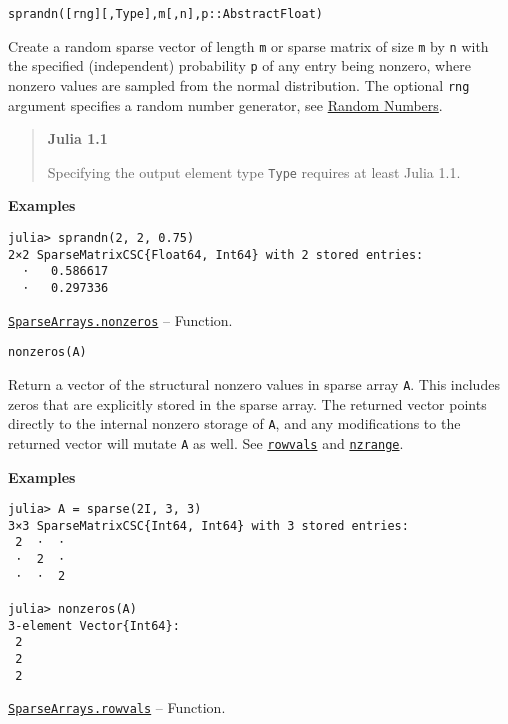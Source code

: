 \begin{adjustwidth}{2em}{0pt}


\begin{verbatim}
sprandn([rng][,Type],m[,n],p::AbstractFloat)
\end{verbatim}

Create a random sparse vector of length \texttt{m} or sparse matrix of size \texttt{m} by \texttt{n} with the specified (independent) probability \texttt{p} of any entry being nonzero, where nonzero values are sampled from the normal distribution. The optional \texttt{rng} argument specifies a random number generator, see \href{@ref}{Random Numbers}.

\begin{quote}
\textbf{Julia 1.1}

Specifying the output element type \texttt{Type} requires at least Julia 1.1.

\end{quote}
\textbf{Examples}


\begin{verbatim}
julia> sprandn(2, 2, 0.75)
2×2 SparseMatrixCSC{Float64, Int64} with 2 stored entries:
  ⋅   0.586617
  ⋅   0.297336
\end{verbatim}



\end{adjustwidth}
\hypertarget{2553509978651134823}{}
\hyperlink{2553509978651134823}{\texttt{SparseArrays.nonzeros}}  -- {Function.}

\begin{adjustwidth}{2em}{0pt}


\begin{verbatim}
nonzeros(A)
\end{verbatim}

Return a vector of the structural nonzero values in sparse array \texttt{A}. This includes zeros that are explicitly stored in the sparse array. The returned vector points directly to the internal nonzero storage of \texttt{A}, and any modifications to the returned vector will mutate \texttt{A} as well. See \hyperlink{11529930160190690800}{\texttt{rowvals}} and \hyperlink{4192027552568489301}{\texttt{nzrange}}.

\textbf{Examples}


\begin{verbatim}
julia> A = sparse(2I, 3, 3)
3×3 SparseMatrixCSC{Int64, Int64} with 3 stored entries:
 2  ⋅  ⋅
 ⋅  2  ⋅
 ⋅  ⋅  2

julia> nonzeros(A)
3-element Vector{Int64}:
 2
 2
 2
\end{verbatim}



\end{adjustwidth}
\hypertarget{11529930160190690800}{}
\hyperlink{11529930160190690800}{\texttt{SparseArrays.rowvals}}  -- {Function.}

